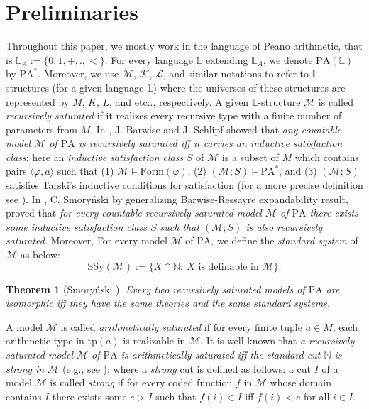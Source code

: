 \documentclass[11pt]{article}
\newtheorem{theorem}{Theorem}[section]
\theoremstyle{plain}
\theoremstyle{definition}
\newcommand{\M}{\mathcal{M}}
\newcommand{\K}{\mathcal{K}}
\newcommand{\LL}{\mathcal{L}}
\newcommand{\NN}{\mathbb{N}}
\newcommand{\pa}{\mathrm{PA}}
\newcommand{\ssy}{\mathrm{SSy}}
\newcommand{\tp}{\mathrm{tp}}
\begin{document}
\section{Preliminaries}
Throughout this paper, we mostly work in the language of Peano arithmetic, that is ${\mathbb{L}_{A}:=\{0,1,+,.,<\}}$. For every language $\mathbb{L}$ extending $\mathbb{L}_{A}$, we denote $\pa(\mathbb{L})$ by  $\pa^{*}$. Moreover, we use $\M$, $\K$, $\LL$,  and similar notations to refer to $\mathbb{L}$-structures (for a given language $\mathbb{L}$) where the universes  of these structures are represented by $M$, $K$, $L$, and etc.., respectively. 
 A given $\mathbb{L}$-structure $ \M $ is called  \textit{recursively saturated} if it realizes every recursive type with a finite number of parameters from  $ M $.  In \cite{bs}, J. Barwise and J. Schlipf showed that  \textit{any countable  model $ \M $ of $ \pa $ is recursively saturated iff it carries an \textit{inductive satisfaction class}}; here  an \textit{inductive satisfaction class} $  S $ of $ \M $ is a subset of $ M $ which contains pairs $ \langle\varphi,a\rangle $ such that (1) $ \M\models \mathrm{Form}(\varphi) $, (2) $ (\M; S)\models\pa^{*} $, and (3) $ (\M; S) $ satisfies Tarski's inductive conditions for satisfaction (for a more precise definition see \cite{kaye}).  In \cite{sm},  C. Smory\'{n}ski by generalizing   Barwise-Ressayre  expandability result, proved that   \textit{for every countable recursively saturated model $ \M $ of $ \pa $ there exists some inductive satisfaction class $  S $ such that $ (\M; S) $ is also recursively saturated}.  Moreover, For every model $ \M $ of $\pa$, we define the \textit{standard system} of $ \M $ as below:
 $$ \ssy(\M):=\{X\cap\NN: \ X \text{ is definable in } \M \}. $$ 
  \begin{theorem}[Smory\'{n}ski \cite{sm}]
 	Every two recursively saturated models of $ \pa $ are isomorphic iff they have the same theories and the same standard systems.
 \end{theorem}
A model  $ \M $ is called  \textit{arithmetically saturated} if for every finite tuple $ \bar{a}\in M $, each arithmetic type in $ \tp(\bar{a}) $  is realizable in $ \M $. It is well-known that \textit{a recursively saturated model $ \M $ of $ \pa $ is arithmetically saturated iff the standard cut $ \NN $ is strong in $ \M $} (e.g., see \cite{wil}); where a \textit{strong} cut is defined as follows: a  cut $ I $ of a  model $ \M $ is called \textit{strong} if for every coded function $ f $ in $ \M $ whose domain contains $ I $ there exists some $ e>I $ such that $ f(i)\in I $ iff $ f(i)<e $ for all $ i\in I $. 
  
\end{document}
